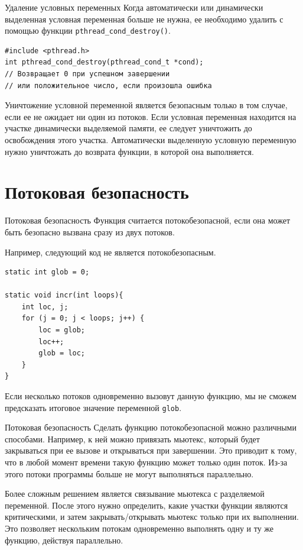\documentclass{beamer}
\begin{document}
\begin{frame}[fragile]{Удаление условных переменных}
    Когда автоматически или динамически выделенная условная переменная больше не нужна, ее необходимо удалить с помощью функции \texttt{pthread\_cond\_destroy()}. 
    
    \begin{verbatim}
#include <pthread.h>
int pthread_cond_destroy(pthread_cond_t *cond);
// Возвращает 0 при успешном завершении 
// или положительное число, если произошла ошибка
    \end{verbatim}
    
    Уничтожение условной переменной является безопасным только в том случае, если ее не ожидает ни один из потоков. Если условная переменная находится на участке динамически выделяемой памяти, ее следует уничтожить до освобождения этого участка. Автоматически выделенную условную переменную нужно уничтожать до возврата функции, в которой она выполняется.
\end{frame}

\section{Потоковая безопасность}

\begin{frame}[fragile]{Потоковая безопасность}
    Функция считается потокобезопасной, если она может быть безопасно вызвана сразу из двух потоков. 
    
    Например, следующий код не является потокобезопасным.
    \begin{verbatim}
static int glob = 0;

static void incr(int loops){
    int loc, j;
    for (j = 0; j < loops; j++) {
        loc = glob;
        loc++;
        glob = loc;
    }
}
    \end{verbatim}
    
    Если несколько потоков одновременно вызовут данную функцию, мы не сможем предсказать итоговое значение переменной \texttt{glob}.
\end{frame}

\begin{frame}{Потоковая безопасность}
    Сделать функцию потокобезопасной можно различными способами. Например, к ней можно привязать мьютекс, который будет закрываться при ее вызове и открываться при завершении. Это приводит к тому, что в любой момент времени такую функцию может только один поток. Из-за этого потоки программы больше не могут выполняться параллельно.
    
    Более сложным решением является связывание мьютекса с разделяемой переменной. После этого нужно определить, какие участки функции являются критическими, и затем закрывать/открывать мьютекс только при их выполнении. Это позволяет нескольким потокам одновременно выполнять одну и ту же функцию, действуя параллельно.
\end{frame}
\end{document}
